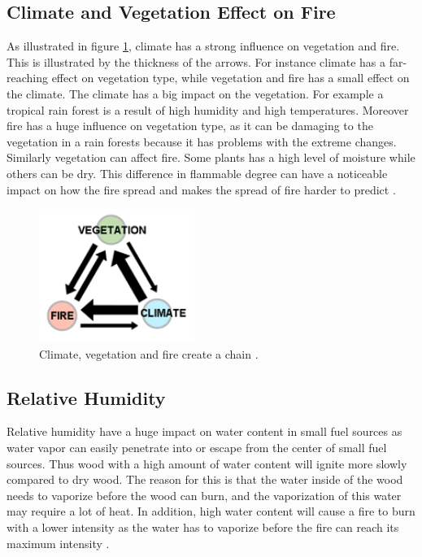 \subsection{Climate and Vegetation Effect on Fire}
As illustrated in figure \ref{fig:fire-climate}, climate has a strong influence on vegetation and fire. This is illustrated by the thickness of the arrows. For instance climate has a far-reaching effect on vegetation type, while vegetation and fire has a small effect on the climate. The climate has a big impact on the vegetation. For example a tropical rain forest is a result of high humidity and high temperatures. Moreover fire has a huge influence on vegetation type, as it can be damaging to the vegetation in a rain forests because it has problems with the extreme changes. Similarly vegetation can affect fire. Some plants has a high level of moisture while others can be dry. This difference in flammable degree can have a noticeable impact on how the fire spread and makes the spread of fire harder to predict \cite{firetypeimage}.

\begin{figure}[here]
  \centering
      \includegraphics[width=0.45\textwidth]{theory/graphics/fire-climate.png}
  \caption{Climate, vegetation and fire create a chain \cite{firetypeimage}. }
  \label{fig:fire-climate}
\end{figure}


\subsection{Relative Humidity}
Relative humidity have a huge impact on water content in small fuel sources as water vapor can easily penetrate into or escape from the center of small fuel sources. Thus wood with a high amount of water content will ignite more slowly compared to dry wood. The reason for this is that the water inside of the wood needs to vaporize before the wood can burn, and the vaporization of this water may require a lot of heat. In addition, high water content will cause a fire to burn with a lower intensity as the water has to vaporize before the fire can reach its maximum intensity \cite{relvhum}.

